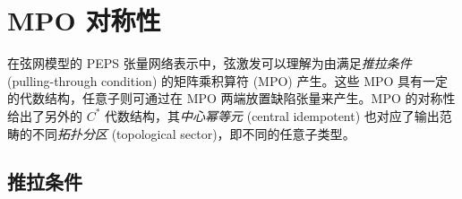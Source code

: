 
\section{MPO 对称性}

在弦网模型的 PEPS 张量网络表示中，弦激发可以理解为由满足\emph{推拉条件} (pulling-through condition) 的矩阵乘积算符 (MPO) 产生。这些 MPO 具有一定的代数结构，任意子则可通过在 MPO 两端放置缺陷张量来产生。MPO 的对称性给出了另外的 $C^*$ 代数结构，其\emph{中心幂等元} (central idempotent) 也对应了输出范畴的不同\emph{拓扑分区} (topological sector)，即不同的任意子类型\cite{bultinck2017anyons,williamson2017symmetry,lootens2019cardy,aasen2020topological,sahinoglu2021characterizing}。

\subsection{推拉条件}

